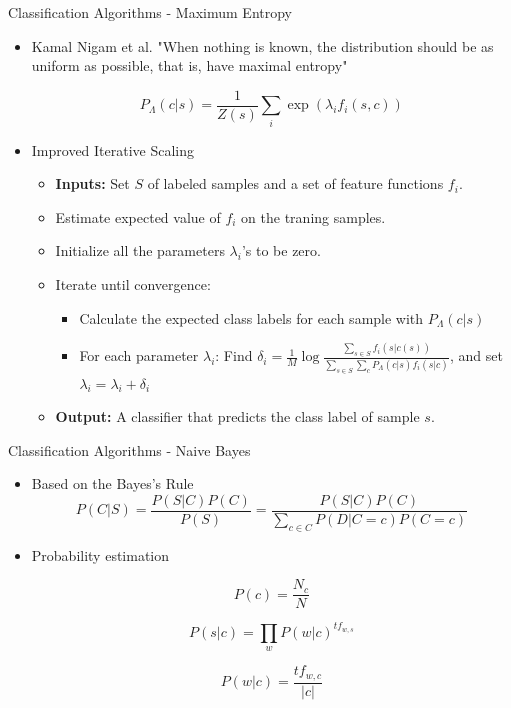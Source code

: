 \documentclass{beamer}
\begin{document}

\begin{frame}{Classification Algorithms - Maximum Entropy}

\begin{itemize}
 \item Kamal Nigam et al. "When nothing is known, the distribution should be as uniform as possible, that is, have maximal entropy" \citep{oai:CiteSeerPSU:93050}

\begin{equation}
\label{mx:expdistr}
P_{\Lambda}(c|s) = \frac{1}{Z(s)} \sum_{i}\exp(\lambda_i f_i(s,c))
\end{equation}

 \item Improved Iterative Scaling

\begin{itemize}
	\item \textbf{Inputs:} Set $S$ of labeled samples and a set of feature functions $f_i$.
	\item Estimate expected value of $f_i$ on the traning samples.
	\item Initialize all the parameters $\lambda_i$'s to be zero.
	\item Iterate until convergence:
	\begin{itemize}
		\item Calculate the expected class labels for each sample with $P_{\Lambda}(c|s)$
		\item For each parameter $\lambda_i$: Find $\delta_i  = \frac{1}{M} \log \frac{\sum_{s \in S} f_i (s|c(s))}{\sum_{s \in S}\sum_{c} P_{\Lambda}(c|s) f_i(s|c) }$, and set $\lambda_i = \lambda_i + \delta_i$
	\end{itemize}		
	\item \textbf{Output:} A classifier that predicts the class label of sample  $s$.
\end{itemize}

\end{itemize}

\end{frame}


\begin{frame}{Classification Algorithms - Naive Bayes}

\begin{itemize}
 \item Based on the Bayes's Rule
\[
P(C|S) = \frac{P (S|C) P (C)}{P(S)} = \frac{P (S|C) P (C)}{\sum_{c \in C} P(D|C=c)P(C=c)}
\] 
\item Probability estimation

\[
P(c) = \frac{N_c}{N}
\]

\[
P(s|c) = \prod_{w} P(w|c)^{tf_{w,s}}
\]

\[
P(w|c) = \frac{tf_{w,c}}{|c|}
\]

\end{itemize}

\end{frame}
\end{document}
